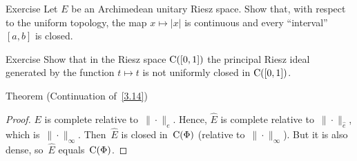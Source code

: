 \documentclass[main.tex]{subfiles}
\begin{document}
%
%
\begin{psec}{4.3}{Exercise}
Let $E$ be an Archimedean unitary Riesz space.
Show that,
with respect to the uniform topology,
the map $x\mapsto|x|$
is continuous
and every ``interval'' $[a,b]$ is closed.
\end{psec}
%
%
\begin{psec}{4.4}{Exercise}
Show that in the Riesz space $\mathrm{C}([0,1])$
the principal Riesz ideal
generated by the function $t\mapsto t$
is not uniformly closed in $\mathrm{C}([0,1])$.
\end{psec}
%
%
\begin{psec}{4.5}{Theorem}
(Continuation of~\ref{3.14})
\end{psec}
\begin{proof}
$E$ is complete relative to~$\|\cdot\|_e$.
Hence, $\hat{E}$ is complete relative to~$\|\cdot\|_{\hat{e}}$,
which is~$\|\cdot\|_\infty$.
Then~$\hat{E}$ is closed in~$\mathrm{C}(\Phi)$
(relative to~$\|\cdot\|_\infty$).
But it is also dense,
so~$\hat{E}$ equals~$\mathrm{C}(\Phi)$. \xqed
\end{proof}
%
%
\end{document}
